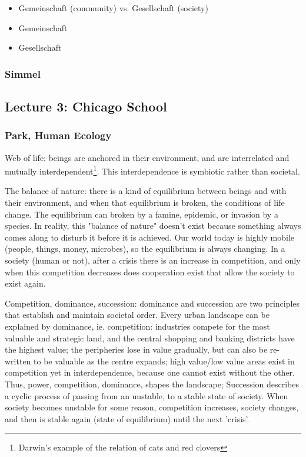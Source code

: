 \documentclass{article}
\begin{document}
\begin{itemize}
  \item Gemeinschaft (community) vs. Gesellschaft (society)
  \item Gemeinschaft
  \item Gesellschaft
\end{itemize}

\subsubsection{Simmel}


\subsection{Lecture 3: Chicago School}


\subsubsection{Park, Human Ecology}

Web of life: beings are anchored in their environment, and are interrelated and mutually interdependent\footnote{Darwin's example of the relation of cats and red clovers}. This interdependence is symbiotic rather than societal. 

The balance of nature: there is a kind of equilibrium between beings and with their environment, and when that equilibrium is broken, the conditions of life change. The equilibrium can broken by a famine, epidemic, or invasion by a species. In reality, this "balance of nature" doesn't exist because something always comes along to disturb it before it is achieved. Our world today is highly mobile (people, things, money, microbes), so the equilibrium is always changing. In a society (human or not), after a crisis there is an increase in competition, and only when this competition decreases does cooperation exist that allow the society to exist again.

Competition, dominance, succession: dominance and succession are two principles that establish and maintain societal order. Every urban landscape can be explained by dominance, ie. competition: industries compete for the most valuable and strategic land, and the central shopping and banking districts have the highest value; the peripheries lose in value gradually, but can also be re-written to be valuable as the centre expands; high value/low value areas exist in competition yet in interdependence, because one cannot exist without the other. Thus, power, competition, dominance, shapes the landscape;
Succession describes a cyclic process of passing from an unstable, to a stable state of society. When society becomes unstable for some reason, competition increases, society changes, and then is stable again (state of equilibrium) until the next 'crisis'.
\end{document}
